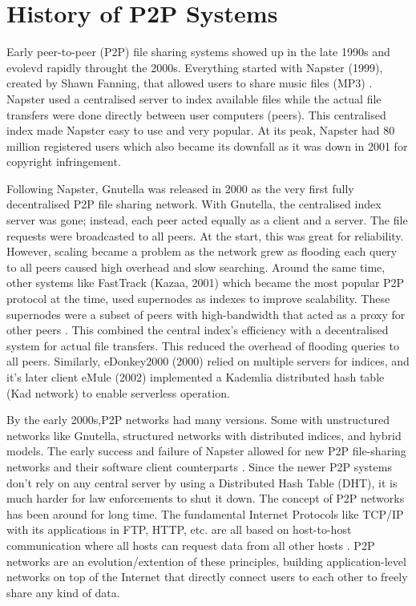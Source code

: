 \documentclass[12pt,a4paper]{report}
\begin{document}
\section{History of P2P Systems}
Early peer-to-peer (P2P) file sharing systems showed up in the late 1990s and evolevd rapidly throught the 2000s. Everything started with Napster (1999), created by Shawn Fanning, that allowed users to share music files (MP3) \cite{wikipedia-p2p}. Napster used a centralised server to index available files while the actual file transfers were done directly between user computers (peers). This centralised index made Napster easy to use and very popular. At its peak, Napster had 80 million registered users \cite{wikipedia-napster} which also became its downfall as it was down in 2001 for copyright infringement.

Following Napster, Gnutella was released in 2000 as the very first fully decentralised P2P file sharing network. With Gnutella, the centralised index server was gone; instead, each peer acted equally as a client and a server. The file requests were broadcasted to all peers. At the start, this was great for reliability. However, scaling became a problem as the network grew as flooding each query to all peers caused high overhead and slow searching. Around the same time, other systems like FastTrack (Kazaa, 2001) which became the most popular P2P protocol at the time, used supernodes as indexes to improve scalability. These supernodes were a subset of peers with high-bandwidth that acted as a proxy for other peers \cite{wikipedia-fasttrack}. This combined the central index's efficiency with a decentralised system for actual file transfers. This reduced the overhead of flooding queries to all peers. Similarly, eDonkey2000 (2000) relied on multiple servers for indices, and it's later client eMule (2002) implemented a Kademlia distributed hash table (Kad network) to enable serverless operation.

By the early 2000s,P2P networks had many versions. Some with unstructured networks like Gnutella, structured networks with distributed indices, and hybrid models. The early success and failure of Napster allowed for new P2P file-sharing networks and their software client counterparts \cite{early-2000s-p2p-state}. Since the newer P2P systems don't rely on any central server by using a Distributed Hash Table (DHT), it is much harder for law enforcements to shut it down. The concept of P2P networks has been around for long time. The fundamental Internet Protocols like TCP/IP with its applications in FTP, HTTP, etc. are all based on host-to-host communication where all hosts can request data from all other hosts \cite{early-2000s-p2p-state}. P2P networks are an evolution/extention of these principles, building application-level networks on top of the Internet that directly connect users to each other to freely share any kind of data.
\end{document}
